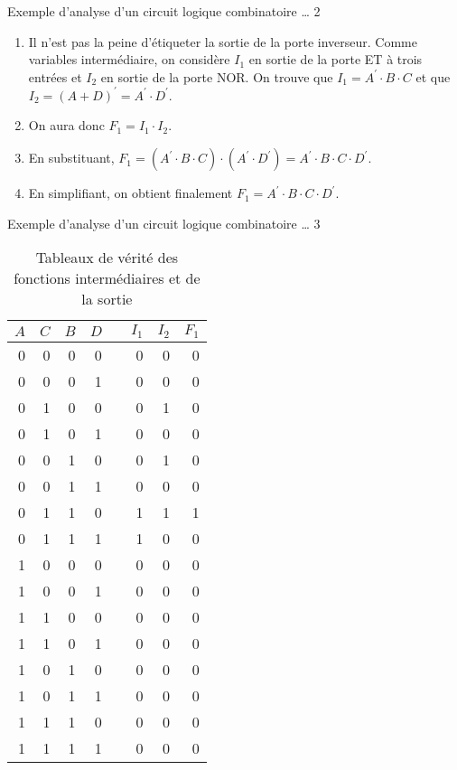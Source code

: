 \documentclass[presentation]{beamer}
\begin{document}
\begin{frame}[label={sec:orgef8f3f2}]{Exemple d'analyse d'un circuit logique combinatoire \ldots{} 2}
\begin{enumerate}
\item Il n'est pas la peine d'étiqueter la sortie de la porte
inverseur. Comme variables intermédiaire, on considère \(I_1\)
en sortie de la porte ET à trois entrées et \(I_2\) en sortie de la
porte NOR. On trouve que \(I_1 = A^\prime \cdot B \cdot C\) et que
\(I_2 = (A + D)^\prime = A^\prime \cdot D^\prime\).

\item On aura donc \(F_1 = I_1 \cdot I_2\).

\item En substituant, \(F_1 = ( A^\prime \cdot B \cdot C ) \cdot (
   A^\prime \cdot D^\prime) = A^\prime \cdot B \cdot C \cdot
   D^\prime\).

\item En simplifiant, on obtient finalement \(F_1 = A^\prime \cdot B
   \cdot C \cdot D^\prime\).
\end{enumerate}
\end{frame}

\begin{frame}[label={sec:org3337758}]{Exemple d'analyse d'un circuit logique combinatoire \ldots{} 3}
\begin{table}[h] \scriptsize
\caption{\label{tab:org1ad4fc6}Tableaux de vérité des fonctions intermédiaires et de la sortie}
\centering
\begin{tabular}{rrrrlrrr}
\(A\) & \(C\) & \(B\) & \(D\) &  & \(I_1\) & \(I_2\) & \(F_1\)\\[0pt]
\hline
0 & 0 & 0 & 0 &  & 0 & 0 & 0\\[0pt]
0 & 0 & 0 & 1 &  & 0 & 0 & 0\\[0pt]
0 & 1 & 0 & 0 &  & 0 & 1 & 0\\[0pt]
0 & 1 & 0 & 1 &  & 0 & 0 & 0\\[0pt]
0 & 0 & 1 & 0 &  & 0 & 1 & 0\\[0pt]
0 & 0 & 1 & 1 &  & 0 & 0 & 0\\[0pt]
0 & 1 & 1 & 0 &  & 1 & 1 & 1\\[0pt]
0 & 1 & 1 & 1 &  & 1 & 0 & 0\\[0pt]
1 & 0 & 0 & 0 &  & 0 & 0 & 0\\[0pt]
1 & 0 & 0 & 1 &  & 0 & 0 & 0\\[0pt]
1 & 1 & 0 & 0 &  & 0 & 0 & 0\\[0pt]
1 & 1 & 0 & 1 &  & 0 & 0 & 0\\[0pt]
1 & 0 & 1 & 0 &  & 0 & 0 & 0\\[0pt]
1 & 0 & 1 & 1 &  & 0 & 0 & 0\\[0pt]
1 & 1 & 1 & 0 &  & 0 & 0 & 0\\[0pt]
1 & 1 & 1 & 1 &  & 0 & 0 & 0\\[0pt]
\end{tabular}
\end{table}
\end{frame}
\end{document}
